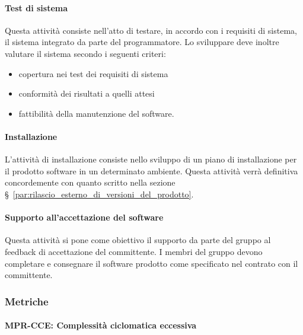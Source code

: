 \documentclass[../../norme-di-progetto.tex]{subfiles}
\begin{document}
\paragraph{Test di sistema}%
\label{par:test_sistema}
Questa attività consiste nell'atto di testare, in accordo con i requisiti di sistema, il sistema integrato da parte del programmatore.
Lo sviluppare deve inoltre valutare il sistema secondo i seguenti criteri:
\begin{itemize}
  \item copertura nei test dei requisiti di sistema
  \item conformità dei risultati a quelli attesi
  \item fattibilità della manutenzione del software.
\end{itemize}

\paragraph{Installazione}%
\label{par:installazione}
L'attività di installazione consiste nello sviluppo di un piano di installazione per il prodotto software in un determinato ambiente.
Questa attività verrà definitiva concordemente con quanto scritto nella sezione §~\ref{par:rilascio_esterno_di_versioni_del_prodotto}.

\paragraph{Supporto all'accettazione del software}%
\label{par:supporto_accettazione_prodotto}
Questa attività si pone come obiettivo il supporto da parte del gruppo al feedback di accettazione del committente.
I membri del gruppo devono completare e consegnare il software prodotto come specificato nel contrato con il committente.

\subsubsection{Metriche}%
\label{subs:sviluppo/metriche}


\paragraph{MPR-CCE: Complessità ciclomatica eccessiva}%
\label{par:MPR-CCE_complessita_ciclomatica_eccessiva}
\end{document}
